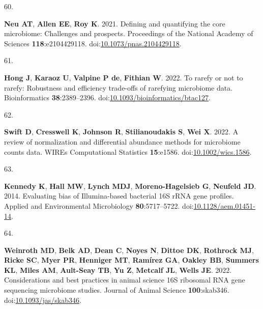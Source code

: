 \documentclass[
]{article}
\newlength{\cslhangindent}
\newlength{\csllabelwidth}
\newlength{\cslentryspacingunit} %
\newenvironment{CSLReferences}[2] %
 {%
  \setlength{\parindent}{0pt}
  \ifodd #1
  \let\oldpar\par
  \def\par{\hangindent=\cslhangindent\oldpar}
  \fi
  \setlength{\parskip}{#2\cslentryspacingunit}
 }%
 {}
\newcommand{\CSLLeftMargin}[1]{\parbox[t]{\csllabelwidth}{#1}}
\newcommand{\CSLRightInline}[1]{\parbox[t]{\linewidth - \csllabelwidth}{#1}\break}
\begin{document}
\begin{CSLReferences}{0}{1}
\leavevmode{}%
\CSLLeftMargin{60. }%
\CSLRightInline{\textbf{Neu AT}, \textbf{Allen EE}, \textbf{Roy K}.
2021. Defining and quantifying the core microbiome: Challenges and
prospects. Proceedings of the National Academy of Sciences
\textbf{118}:e2104429118.
doi:\href{https://doi.org/10.1073/pnas.2104429118}{10.1073/pnas.2104429118}.}

\leavevmode{}%
\CSLLeftMargin{61. }%
\CSLRightInline{\textbf{Hong J}, \textbf{Karaoz U}, \textbf{Valpine P
de}, \textbf{Fithian W}. 2022. To rarefy or not to rarefy: Robustness
and efficiency trade-offs of rarefying microbiome data. Bioinformatics
\textbf{38}:2389--2396.
doi:\href{https://doi.org/10.1093/bioinformatics/btac127}{10.1093/bioinformatics/btac127}.}

\leavevmode{}%
\CSLLeftMargin{62. }%
\CSLRightInline{\textbf{Swift D}, \textbf{Cresswell K}, \textbf{Johnson
R}, \textbf{Stilianoudakis S}, \textbf{Wei X}. 2022. A review of
normalization and differential abundance methods for microbiome counts
data. {WIREs} Computational Statistics \textbf{15}:e1586.
doi:\href{https://doi.org/10.1002/wics.1586}{10.1002/wics.1586}.}

\leavevmode{}%
\CSLLeftMargin{63. }%
\CSLRightInline{\textbf{Kennedy K}, \textbf{Hall MW}, \textbf{Lynch
MDJ}, \textbf{Moreno-Hagelsieb G}, \textbf{Neufeld JD}. 2014. Evaluating
bias of {I}llumina-based bacterial 16S {rRNA} gene profiles. Applied and
Environmental Microbiology \textbf{80}:5717--5722.
doi:\href{https://doi.org/10.1128/aem.01451-14}{10.1128/aem.01451-14}.}

\leavevmode{}%
\CSLLeftMargin{64. }%
\CSLRightInline{\textbf{Weinroth MD}, \textbf{Belk AD}, \textbf{Dean C},
\textbf{Noyes N}, \textbf{Dittoe DK}, \textbf{Rothrock MJ},
\textbf{Ricke SC}, \textbf{Myer PR}, \textbf{Henniger MT},
\textbf{Ramírez GA}, \textbf{Oakley BB}, \textbf{Summers KL},
\textbf{Miles AM}, \textbf{Ault-Seay TB}, \textbf{Yu Z}, \textbf{Metcalf
JL}, \textbf{Wells JE}. 2022. Considerations and best practices in
animal science 16S ribosomal {RNA} gene sequencing microbiome studies.
Journal of Animal Science \textbf{100}:skab346.
doi:\href{https://doi.org/10.1093/jas/skab346}{10.1093/jas/skab346}.}

\end{CSLReferences}


\setlength{\parindent}{0in}
\setlength{\leftskip}{0in}
\end{document}
